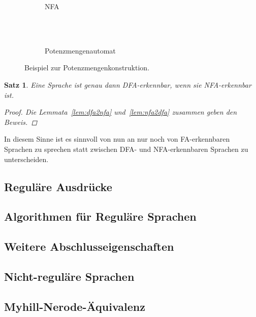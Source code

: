 \documentclass[11pt, a4paper]{article}
\theoremstyle{definition}
\theoremstyle{plain}
\newtheorem{theorem}[definition]{Satz}
\numberwithin{equation}{section}
\begin{document}
\begin{figure}
	\centering
	\begin{subfigure}[b]{.49\textwidth}
		\centering
		
		\caption{NFA}
		\label{fig:powersetconstruction_nfa}
	\end{subfigure}\\
	\ \\
	\begin{subfigure}[b]{.49\textwidth}
		\centering
		
		\caption{Potenzmengenautomat}
		\label{fig:powersetconstruction_dfa}
	\end{subfigure}
	\caption{Beispiel zur Potenzmengenkonstruktion.}
	\label{fig:powersetconstruction}
\end{figure}
\begin{theorem}
	Eine Sprache ist genau dann DFA-erkennbar, wenn sie NFA-erkennbar ist.
	\begin{proof}
		Die Lemmata~\ref{lem:dfa2nfa} und~\ref{lem:nfa2dfa} zusammen geben den Beweis.
	\end{proof}
\end{theorem}
In diesem Sinne ist es sinnvoll von nun an nur noch von FA-erkennbaren Sprachen zu sprechen statt zwischen DFA- und NFA-erkennbaren Sprachen zu unterscheiden.


\subsection{Reguläre Ausdrücke}\label{sec:regular_regexp}
\subsection{Algorithmen für Reguläre Sprachen}\label{sec:regular_algorithms}
\subsection{Weitere Abschlusseigenschaften}\label{sec:regular_closure2}
\subsection{Nicht-reguläre Sprachen}\label{sec:regular_nonregular}
\subsection{Myhill-Nerode-Äquivalenz}\label{sec:regular_myhill-nerode}




\newpage
\end{document}

